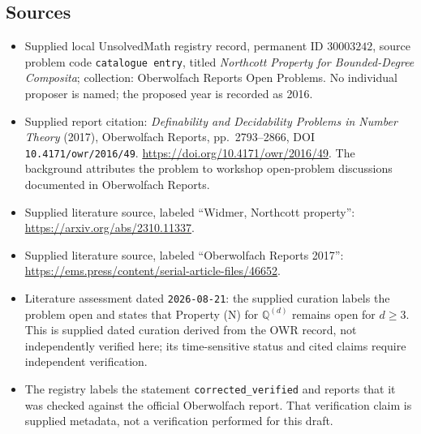 \documentclass[11pt]{article}
\newcommand{\Q}{\mathbb{Q}}
\begin{document}
\subsection{Sources}
\begin{itemize}
\item Supplied local UnsolvedMath registry record, permanent ID \(30003242\), source problem code \texttt{catalogue entry}, titled \emph{Northcott Property for Bounded-Degree Composita}; collection: Oberwolfach Reports Open Problems. No individual proposer is named; the proposed year is recorded as 2016.
\item Supplied report citation: \emph{Definability and Decidability Problems in Number Theory} (2017), Oberwolfach Reports, pp.~2793--2866, DOI \texttt{10.4171/owr/2016/49}. \url{https://doi.org/10.4171/owr/2016/49}. The background attributes the problem to workshop open-problem discussions documented in Oberwolfach Reports.
\item Supplied literature source, labeled ``Widmer, Northcott property'': \url{https://arxiv.org/abs/2310.11337}.
\item Supplied literature source, labeled ``Oberwolfach Reports 2017'': \url{https://ems.press/content/serial-article-files/46652}.
\item Literature assessment dated \texttt{2026-08-21}: the supplied curation labels the problem open and states that Property (N) for \(\Q^{(d)}\) remains open for \(d\geq3\). This is supplied dated curation derived from the OWR record, not independently verified here; its time-sensitive status and cited claims require independent verification.
\item The registry labels the statement \texttt{corrected\_verified} and reports that it was checked against the official Oberwolfach report. That verification claim is supplied metadata, not a verification performed for this draft.
\end{itemize}
\end{document}
